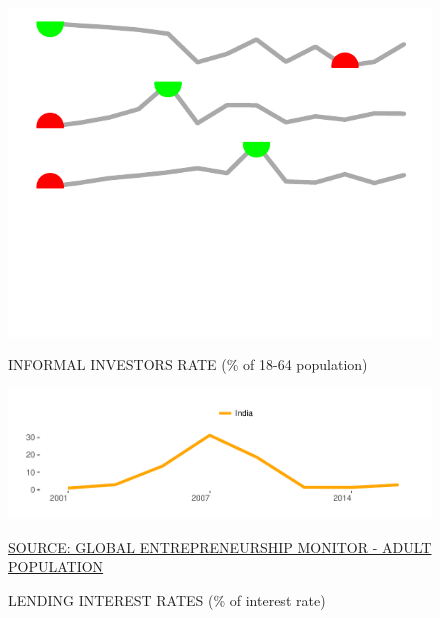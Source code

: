 \documentclass{article}\usepackage[]{graphicx}\usepackage[]{color}
\makeatletter
\def\maxwidth{ %
  \ifdim\Gin@nat@width>\linewidth
    \linewidth
  \else
    \Gin@nat@width
  \fi
}
\makeatother
\begin{document}
\begin{figure}
\begin{minipage}[c]{0.95\textwidth}
\begin{minipage}[c]{0.95\textwidth}
\begin{minipage}[c]{0.13\textwidth}
{\centering \includegraphics[width=\maxwidth]{figure/sparklines_Finance-1} 

}



        \vspace*{-0.5cm}
      \end{minipage}
  \end{minipage}
    
  \begin{minipage}[c]{0.95\textwidth} %
    \vspace*{0.6cm}
    \begin{minipage}[c]{0.49\textwidth} %
      \small{\textcolor[HTML]{818181}{INFORMAL INVESTORS RATE \footnotesize(\% of 18-64 population)}}


{\centering \includegraphics[width=\maxwidth]{figure/line_chart_Finance1-1} 

}



      \vspace*{-0.2cm} 
      \scriptsize{\href{http://www.gemconsortium.org/data/sets}{\textcolor[HTML]{22A6F5}{SOURCE: GLOBAL ENTREPRENEURSHIP MONITOR - ADULT POPULATION}}}
    \end{minipage}
    \begin{minipage}[c]{0.49\textwidth} %
      \small{\textcolor[HTML]{818181}{LENDING INTEREST RATES \footnotesize(\% of interest rate)}}



\end{minipage}
\end{minipage}
\end{minipage}
\end{figure}
\end{document}
